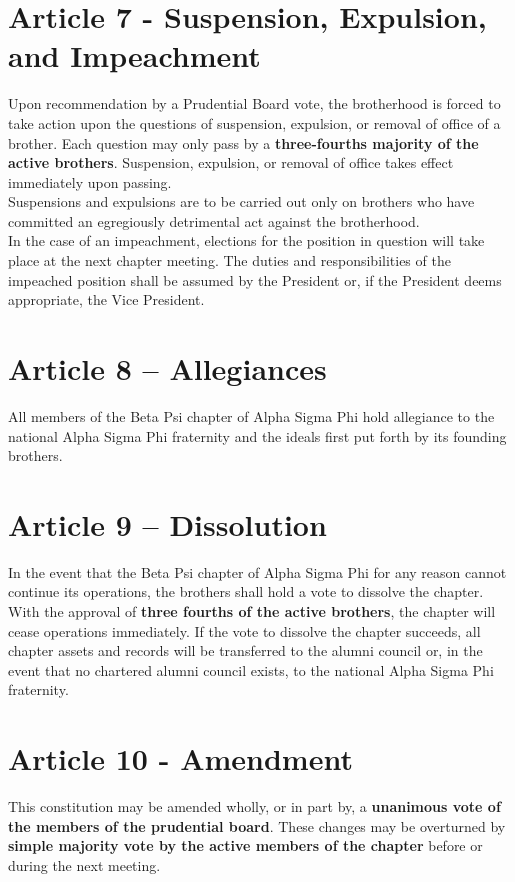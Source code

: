 \documentclass{article}
\begin{document}
\section*{Article 7 - Suspension, Expulsion, and Impeachment}
\hspace*{1cm}Upon recommendation by a Prudential Board vote, the brotherhood is forced to take action upon the questions of suspension, expulsion, or removal of office of a brother. Each question may only pass by a \textbf{three-fourths majority of the active brothers}. Suspension, expulsion, or removal of office takes effect immediately upon passing.\\ 

Suspensions and expulsions are to be carried out only on brothers who have committed an egregiously detrimental act against the brotherhood.\\

In the case of an impeachment, elections for the position in question will take place at the next chapter meeting. The duties and responsibilities of the impeached position shall be assumed by the President or, if the President deems appropriate, the Vice President.

\section*{Article 8 – Allegiances}
\hspace*{1cm}All members of the Beta Psi chapter of Alpha Sigma Phi hold allegiance to the 
national Alpha Sigma Phi fraternity and the ideals first put forth by its founding brothers.

\section*{Article 9 – Dissolution}
\hspace*{1cm}In the event that the Beta Psi chapter of Alpha Sigma Phi for any reason cannot continue its operations, the brothers shall hold a vote to dissolve the chapter. With the approval of \textbf{three fourths of the active brothers}, the chapter will cease operations immediately. If the vote to dissolve the chapter succeeds, all chapter assets and records will be transferred to the alumni council or, in the event that no chartered alumni council exists, to the national Alpha Sigma Phi fraternity.

\section*{Article 10 - Amendment}
\hspace*{1cm}This constitution may be amended wholly, or in part by, a \textbf{unanimous vote of the members of the prudential board}. These changes may be overturned by \textbf{simple majority vote by the active members of the chapter} before or during the next meeting.
\end{document}
